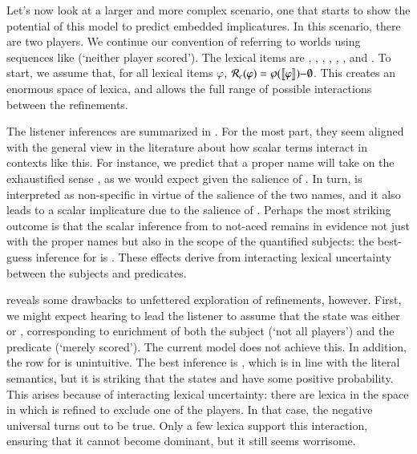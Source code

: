 \documentclass[leqno,12pt]{article}
\begin{document}
Let's now look at a larger and more complex scenario, one that starts
to show the potential of this model to predict embedded
implicatures. In this scenario, there are two players. We continue our
convention of referring to worlds using sequences like 
(`neither player scored'). The lexical items are ,
, , , , ,
and .  To start, we assume that, for all lexical items
$\varphi$, $\mathcal{R}_{c}(\varphi) = \wp(\llbracket\varphi\rrbracket){-}\emptyset$.  This
creates an enormous space of lexica, and allows the full range of
possible interactions between the refinements.

The listener inferences are summarized in . For
the most part, they seem aligned with the general view in the
literature about how scalar terms interact in contexts like this. For
instance, we predict that a proper name  will take on the
exhaustified sense , as we would expect given the
salience of . In turn,  is interpreted as
non-specific in virtue of the salience of the two names, and it also
leads to a scalar implicature due to the salience of
. Perhaps the most striking outcome is that the scalar
inference from  to not-aced remains in evidence not just
with the proper names but also in the scope of the quantified
subjects: the best-guess inference for  is
.  These effects derive from interacting lexical uncertainty
between the subjects and predicates.

 reveals some drawbacks to unfettered exploration
of refinements, however. First, we might expect hearing  to lead the listener to assume that the state was
either  or , corresponding to enrichment of both
the subject (`not all players') and the predicate (`merely
scored'). The current model does not achieve this. In addition, the
row for  is unintuitive. The best inference is
, which is in line with the literal semantics, but it is
striking that the states  and  have some positive
probability. This arises because of interacting lexical uncertainty:
there are lexica in the space in which  is refined to
exclude one of the players. In that case, the negative universal turns
out to be true. Only a few lexica support this interaction, ensuring
that it cannot become dominant, but it still seems worrisome.
\end{document}
